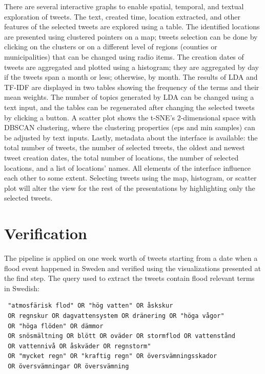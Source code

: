   There are several interactive graphs to enable spatial, temporal, and textual exploration of
  tweets. The text, created time, location extracted, and other features of the selected tweets are
  explored using a table. The identified locations are presented using clustered pointers on a map;
  tweets selection can be done by clicking on the clusters or on a different level of regions
  (counties or municipalities) that can be changed using radio items. The creation dates of tweets
  are aggregated and plotted using a histogram; they are aggregated by day if the tweets span a
  month or less; otherwise, by month. The results of \ac{LDA} and \ac{TF-IDF} are displayed in two
  tables showing the frequency of the terms and their mean weights. The number of topics generated
  by \ac{LDA} can be changed using a text input, and the tables can be regenerated after changing
  the selected tweets by clicking a button. A scatter plot shows the \ac{t-SNE}'s 2-dimensional
  space with \ac{DBSCAN}  clustering, where the clustering properties (eps and min samples) can be
  adjusted by text inputs. Lastly, metadata about the interface is available: the total number
  of tweets, the number of selected tweets, the oldest and newest tweet creation dates, the total
  number of locations, the number of selected locations, and a list of locations' names. All
  elements of the interface influence each other to some extent. Selecting tweets using the map,
  histogram, or scatter plot will alter the view for the rest of the presentations by highlighting
  only the selected tweets.

\section{Verification}

The pipeline is applied on one week worth of tweets starting from a date when a flood event happened
in Sweden and verified using the visualizations presented at the find step. The query used to extract the
tweets contain flood relevant terms in Swedish:

\begin{verbatim}
 "atmosfärisk flod" OR "hög vatten" OR åskskur
 OR regnskur OR dagvattensystem OR dränering OR "höga vågor"
 OR "höga flöden" OR dämmor
 OR snösmältning OR blött OR oväder OR stormflod OR vattenstånd
 OR vattennivå OR åskväder OR regnstorm"
 OR "mycket regn" OR "kraftig regn" OR översvämningsskador 
 OR översvämningar OR översvämning
\end{verbatim}
